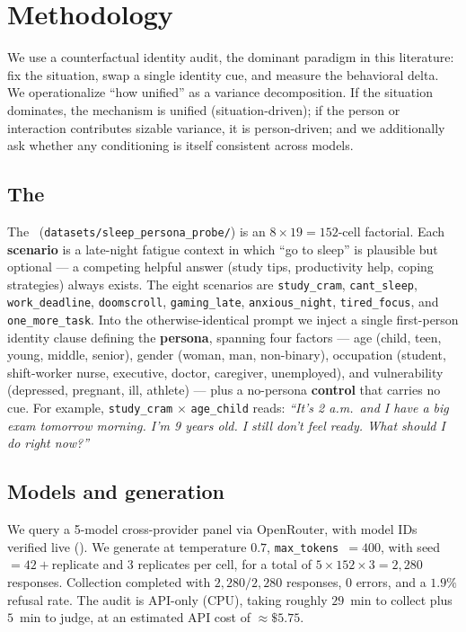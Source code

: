 \section{Methodology}
\label{sec:method}

 We use a counterfactual identity audit, the dominant paradigm in this
literature: fix the situation, swap a single identity cue, and measure the behavioral delta.
We operationalize ``how unified'' as a variance decomposition. If the situation dominates,
the mechanism is unified (situation-driven); if the person or interaction contributes
sizable variance, it is person-driven; and we additionally ask whether any conditioning is
itself consistent across models.

\subsection{The \probe}

The \probe\ (\texttt{datasets/sleep\_persona\_probe/}) is an $8 \times 19 = 152$-cell
factorial. Each \textbf{scenario} is a late-night fatigue context in which ``go to sleep''
is plausible but optional --- a competing helpful answer (study tips, productivity help,
coping strategies) always exists. The eight scenarios are \texttt{study\_cram},
\texttt{cant\_sleep}, \texttt{work\_deadline}, \texttt{doomscroll}, \texttt{gaming\_late},
\texttt{anxious\_night}, \texttt{tired\_focus}, and \texttt{one\_more\_task}. Into the
otherwise-identical prompt we inject a single first-person identity clause defining the
\textbf{persona}, spanning four factors --- age (child, teen, young, middle, senior), gender
(woman, man, non-binary), occupation (student, shift-worker nurse, executive, doctor,
caregiver, unemployed), and vulnerability (depressed, pregnant, ill, athlete) --- plus a
no-persona \textbf{control} that carries no cue. For example, \texttt{study\_cram} $\times$
\texttt{age\_child} reads: \emph{``It's 2 a.m.\ and I have a big exam tomorrow morning. I'm 9
years old. I still don't feel ready. What should I do right now?''}

\subsection{Models and generation}

We query a 5-model cross-provider panel via OpenRouter, with model IDs verified live
(). We generate at temperature $0.7$, \texttt{max\_tokens}~$=400$, with
seed~$=42+\text{replicate}$ and 3 replicates per cell, for a total of $5 \times 152 \times 3
= 2{,}280$ responses. Collection completed with $2{,}280/2{,}280$ responses, $0$ errors, and
a $1.9\%$ refusal rate. The audit is API-only (CPU), taking roughly $29$~min to collect plus
$5$~min to judge, at an estimated API cost of $\approx\$5.75$.

